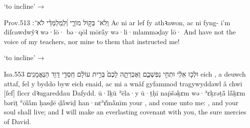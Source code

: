 \begin{frame}{\ex {} ‘to incline’ → }
	\begin{example}{Prov.}{5}{13}{}{}
		\quoling
		{וְֽלֹא־ בְּק֣וֹל מוֹרָ֑י וְ֝לִֽמְלַמְּדַ֗י לֹא־ ׃}
		{Ac ni  ar lef fy athꝛawon, ac ni  fyng- i’m diſcawdwŷꝛ}
		{wə·lō· bə·qōl mōrå̄y wə·li·mlamməḏay lō· }
		{And have not  the voice of my teachers, nor  mine  to them that instructed me!}
	\end{example}
\end{frame}


\begin{frame}{\ex {} ‘to incline’ → }
	\begin{example}{Isa.}{55}{3}{}{}
		\quoling
		{  וּלְכ֣וּ אֵלַ֔י  וּתְחִ֣י נַפְשְׁכֶ֑ם וְאֶכְרְתָ֤ה לָכֶם֙ בְּרִ֣ית עוֹלָ֔ם חַֽסְדֵ֥י דָוִ֖ד הַנֶּאֱמָנִֽים׃}
		{ eich , a deuwch attaf,  fel y byddo byw eich enaid, ac mi a wnâf gyfammod tragywyddawl â chwi [ſef] ſiccr dꝛugareddau Dafydd.}
		{  ū·lḵū ʾēla·y  ū·ṯḥī nap̄šəḵɛm wə·ʾɛḵrəṯå̄ lå̄ḵɛm bərīṯ ʿōlå̄m ḥasḏē ḏå̄wīḏ han·nɛʾɛ̆må̄nīm}
		{ your , and come unto me: , and your soul shall live; and I will make an everlasting covenant with you,  the sure mercies of David.}
	\end{example}
\end{frame}



